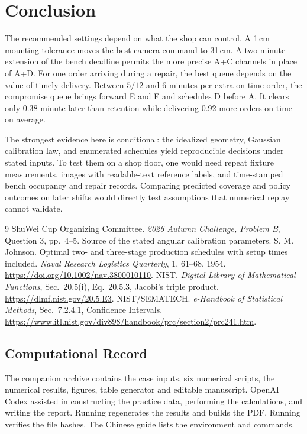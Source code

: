 \documentclass{swmcmthesis}
\newcommand{\code}[1]{\texttt{\detokenize{#1}}}
\begin{document}
\clearpage
\section{Conclusion}
The recommended settings depend on what the shop can control. A 1\,cm mounting tolerance moves the best camera command to 31\,cm. A two-minute extension of the bench deadline permits the more precise A+C channels in place of A+D. For one order arriving during a repair, the best queue depends on the value of timely delivery. Between \(5/12\) and 6 minutes per extra on-time order, the compromise queue brings forward E and F and schedules D before A. It clears only 0.38 minute later than retention while delivering 0.92 more orders on time on average.

The strongest evidence here is conditional: the idealized geometry, Gaussian calibration law, and enumerated schedules yield reproducible decisions under stated inputs. To test them on a shop floor, one would need repeat fixture measurements, images with readable-text reference labels, and time-stamped bench occupancy and repair records. Comparing predicted coverage and policy outcomes on later shifts would directly test assumptions that numerical replay cannot validate.

\begin{thebibliography}{9}
 ShuWei Cup Organizing Committee. \emph{2026 Autumn Challenge, Problem B}, Question 3, pp.~4--5. Source of the stated angular calibration parameters.
 S. M. Johnson. Optimal two- and three-stage production schedules with setup times included. \emph{Naval Research Logistics Quarterly}, 1, 61--68, 1954. \url{https://doi.org/10.1002/nav.3800010110}.
 NIST. \emph{Digital Library of Mathematical Functions}, Sec.~20.5(i), Eq.~20.5.3, Jacobi's triple product. \url{https://dlmf.nist.gov/20.5.E3}.
 NIST/SEMATECH. \emph{e-Handbook of Statistical Methods}, Sec.~7.2.4.1, Confidence Intervals. \url{https://www.itl.nist.gov/div898/handbook/prc/section2/prc241.htm}.
\end{thebibliography}
\subsection*{Computational Record}
The companion archive contains the case inputs, six numerical scripts, the numerical results, figures, table generator and editable manuscript. OpenAI Codex assisted in constructing the practice data, performing the calculations, and writing the report. Running \code{python reproduce.py} regenerates the results and builds the PDF. Running \code{python reproduce.py --verify} verifies the file hashes. The Chinese guide lists the environment and commands.
\clearpage
\end{document}
